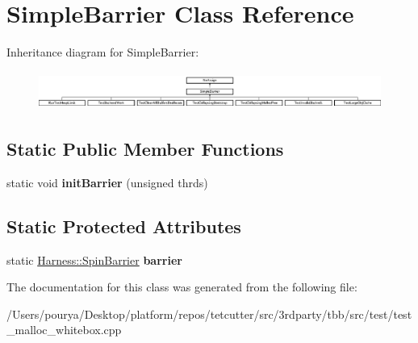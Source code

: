 \hypertarget{classSimpleBarrier}{}\section{Simple\+Barrier Class Reference}
\label{classSimpleBarrier}
Inheritance diagram for Simple\+Barrier\+:\begin{figure}[H]
\begin{center}
\leavevmode
\includegraphics[height=1.250000cm]{classSimpleBarrier}
\end{center}
\end{figure}
\subsection*{Static Public Member Functions}
\begin{DoxyCompactItemize}
\item 
\hypertarget{classSimpleBarrier_a67c451d2b5d68f4254bf5b5c3018c68d}{}static void {\bfseries init\+Barrier} (unsigned thrds)\label{classSimpleBarrier_a67c451d2b5d68f4254bf5b5c3018c68d}

\end{DoxyCompactItemize}
\subsection*{Static Protected Attributes}
\begin{DoxyCompactItemize}
\item 
\hypertarget{classSimpleBarrier_ac0122a6451a794085bb5344f78e7ce06}{}static \hyperlink{classHarness_1_1SpinBarrier}{Harness\+::\+Spin\+Barrier} {\bfseries barrier}\label{classSimpleBarrier_ac0122a6451a794085bb5344f78e7ce06}

\end{DoxyCompactItemize}


The documentation for this class was generated from the following file\+:\begin{DoxyCompactItemize}
\item 
/\+Users/pourya/\+Desktop/platform/repos/tetcutter/src/3rdparty/tbb/src/test/test\+\_\+malloc\+\_\+whitebox.\+cpp\end{DoxyCompactItemize}
